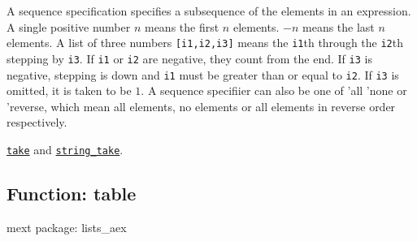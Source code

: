 \documentclass[]{article}
\begin{document}
\vspace{5 pt}
A sequence specification specifies a subsequence of the elements in an expression. A single positive number $n$ means the first $n$ elements. $-n$ means the last $n$ elements. A list of three numbers \verb#[i1,i2,i3]# means the \verb#i1#th through the \verb#i2#th stepping by \verb#i3#. If \verb#i1# 
or \verb#i2# are negative, they count from the end. If \verb#i3# is negative, stepping is down and \verb#i1# must be greater than or equal to \verb#i2#. If \verb#i3# is omitted, it is taken to be $1$. A sequence specifiier can also be one of 'all 'none or 'reverse, which mean all elements, no 
elements or all elements in reverse order respectively. 

\vspace{5 pt}


 \hyperlink{take}{{\tt take}} and \hyperlink{string_take}{{\tt string\_take}}.

\vspace{5 pt}


\subsection{Function: table\label{sec:table}}
\hypertarget{table}{}


\noindent mext package: lists\_aex
\end{document}
